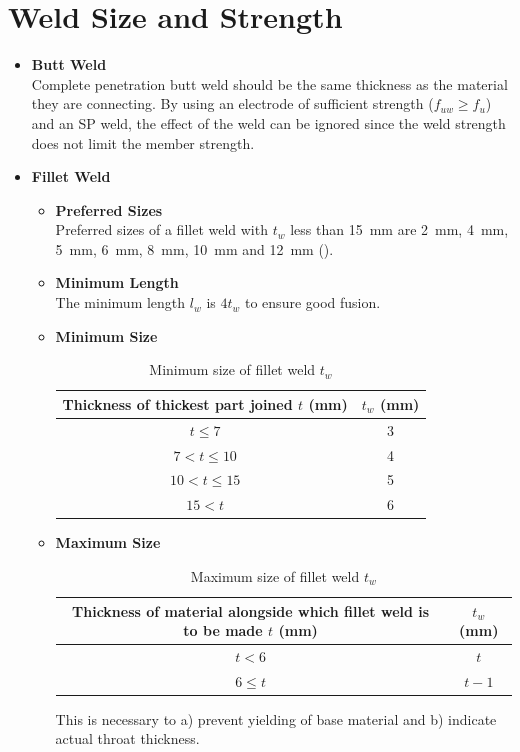 \section{Weld Size and Strength}
\begin{itemize}
\item \textbf{Butt Weld}\\Complete penetration butt weld should be the same thickness as the material they are connecting. By using an electrode of sufficient strength ($f_{uw}\geqslant{}f_u$) and an SP weld, the effect of the weld can be ignored since the weld strength does not limit the member strength.
\item \textbf{Fillet Weld}
\begin{itemize}
\item \textbf{Preferred Sizes}\\Preferred sizes of a fillet weld with $t_w$ less than \SI{15}{\mm} are \SI{2}{\mm}, \SI{4}{\mm}, \SI{5}{\mm}, \SI{6}{\mm}, \SI{8}{\mm}, \SI{10}{\mm} and \SI{12}{\mm} ().
\item \textbf{Minimum Length}\\The minimum length $l_w$ is $4t_w$ to ensure good fusion.
\item \textbf{Minimum Size}
\begin{table}[H]
\centering\footnotesize\caption{Minimum size of fillet weld $t_w$}
\begin{tabular}{cc}
	\toprule
	Thickness of thickest part joined $t$ (\si{\mm}) & $t_w$ (\si{\mm}) \\ \midrule
	                 $t\leqslant7$                   &     \num{3}      \\
	                $7<t\leqslant10$                 &     \num{4}      \\
	               $10<t\leqslant15$                 &     \num{5}      \\
	                     $15<t$                      &     \num{6}      \\ \bottomrule
\end{tabular}
\end{table}
\item \textbf{Maximum Size}
\begin{table}[H]
\centering\footnotesize\caption{Maximum size of fillet weld $t_w$}
\begin{tabular}{cc}
	\toprule
	Thickness of material alongside which fillet weld is to be made $t$ (\si{\mm}) & $t_w$ (\si{\mm}) \\ \midrule
	                                    $t<6$                                      &       $t$        \\
	                               $6\leqslant{}t$                                 &      $t-1$       \\ \bottomrule
\end{tabular}
\end{table}
This is necessary to a) prevent yielding of base material and b) indicate actual throat thickness.
\end{itemize}
\end{itemize}

